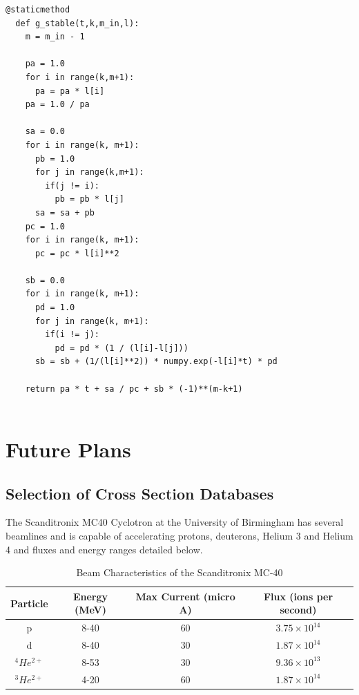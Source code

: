 \documentclass[12pt,twoside]{manual}
\begin{document}
\begin{lstlisting}[style=spython, caption={}]
  @staticmethod
  def g_stable(t,k,m_in,l):
    m = m_in - 1

    pa = 1.0
    for i in range(k,m+1):
      pa = pa * l[i]
    pa = 1.0 / pa

    sa = 0.0
    for i in range(k, m+1):
      pb = 1.0
      for j in range(k,m+1):
        if(j != i):
          pb = pb * l[j]
      sa = sa + pb
    pc = 1.0 
    for i in range(k, m+1):
      pc = pc * l[i]**2

    sb = 0.0
    for i in range(k, m+1):
      pd = 1.0
      for j in range(k, m+1):
        if(i != j):
          pd = pd * (1 / (l[i]-l[j]))
      sb = sb + (1/(l[i]**2)) * numpy.exp(-l[i]*t) * pd

    return pa * t + sa / pc + sb * (-1)**(m-k+1)  
      
\end{lstlisting}










\chapter{Future Plans}

\section{Selection of Cross Section Databases}

The Scanditronix MC40 Cyclotron at the University of Birmingham has several beamlines and is capable of accelerating protons, deuterons, Helium 3 and Helium 4 and fluxes and energy ranges detailed below.  

\begin{table}[h]
\begin{center}
\begin{tabular}{c c c c}
\hline
Particle & Energy (MeV) & Max Current (micro A) & Flux (ions per second)\\
\hline
p & 8-40 & 60 & $3.75 \times 10^14$ \\
d & 8-40 & 30 & $1.87 \times 10^14$ \\
${}^4 He^{2+}$ & 8-53 & 30 & $9.36 \times 10^13$ \\
${}^3 He^{2+}$ & 4-20 & 60 & $1.87 \times 10^14$ \\
\end{tabular}
\end{center}
\caption{Beam Characteristics of the Scanditronix MC-40}
\end{table}
\end{document}
